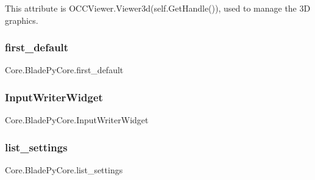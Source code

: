 This attribute is O\+C\+C\+Viewer.\+Viewer3d(self.\+Get\+Handle()), used to manage the 3D graphics. 

\hypertarget{class_core_1_1_blade_py_core_af0ce94ff8ed058ada4057b3062de1d0d}{}\label{class_core_1_1_blade_py_core_af0ce94ff8ed058ada4057b3062de1d0d} 
\subsubsection{\texorpdfstring{first\+\_\+default}{first\_default}}
{\footnotesize\ttfamily Core.\+Blade\+Py\+Core.\+first\+\_\+default}

\hypertarget{class_core_1_1_blade_py_core_a4ead2c1cc874da56fad290cca0630fc0}{}\label{class_core_1_1_blade_py_core_a4ead2c1cc874da56fad290cca0630fc0} 
\subsubsection{\texorpdfstring{Input\+Writer\+Widget}{InputWriterWidget}}
{\footnotesize\ttfamily Core.\+Blade\+Py\+Core.\+Input\+Writer\+Widget}

\hypertarget{class_core_1_1_blade_py_core_a96038d8a4727208ba2e9cd359bcd4781}{}\label{class_core_1_1_blade_py_core_a96038d8a4727208ba2e9cd359bcd4781} 
\subsubsection{\texorpdfstring{list\+\_\+settings}{list\_settings}}
{\footnotesize\ttfamily Core.\+Blade\+Py\+Core.\+list\+\_\+settings}

\hypertarget{class_core_1_1_blade_py_core_a819ef9e1cd2f233d92a5379532060bd0}{}\label{class_core_1_1_blade_py_core_a819ef9e1cd2f233d92a5379532060bd0} 
